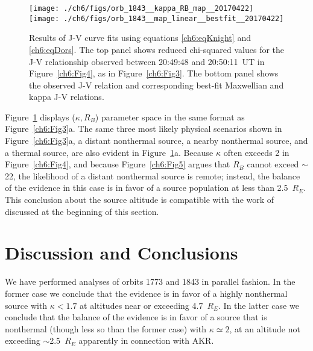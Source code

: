 
  \begin{figure}
    \centering
    \noindent\texttt{[image: ./ch6/figs/orb\_1843\_\_kappa\_RB\_map\_\_20170422]}
    \noindent\texttt{[image: ./ch6/figs/orb\_1843\_\_map\_linear\_\_bestfit\_\_20170422]}
    \caption[Orbit 1843: Reduced chi-squared values for observed J-V curves and
    corresponding best-fit J-V curves.]{Results of J-V curve fits using
      equations \ref{ch6:eqKnight} and \ref{ch6:eqDors}. The top panel shows
      reduced chi-squared values for the J-V relationship observed between
      20:49:48 and 20:50:11~UT in Figure~\ref{ch6:Fig4}, as in
      Figure~\ref{ch6:Fig3}. The bottom panel shows the observed J-V relation
      and corresponding best-fit Maxwellian and kappa J-V relations.}
    \label{ch6:Fig6}
  \end{figure}

  Figure~\ref{ch6:Fig6} displays ($\kappa, R_B$) parameter space in the same
  format as Figure~\ref{ch6:Fig3}a. The same three most likely physical
  scenarios shown in Figure~\ref{ch6:Fig3}a, a distant nonthermal source, a
  nearby nonthermal source, and a thermal source, are also evident in
  Figure~\ref{ch6:Fig6}a. Because $\kappa$ often exceeds 2 in
  Figure~\ref{ch6:Fig4}, and because Figure~\ref{ch6:Fig5} argues that $R_B$
  cannot exceed $\sim$22, the likelihood of a distant nonthermal source is
  remote; instead, the balance of the evidence in this case is in favor of a
  source population at less than 2.5~$R_E$. This conclusion about the source
  altitude is compatible with the work of \citet{Ergun1998} discussed at the
  beginning of this section.
  
  \section{Discussion and Conclusions}

  We have performed analyses of orbits 1773 and 1843 in parallel fashion. In the
  former case we conclude that the evidence is in favor of a highly nonthermal
  source with $\kappa < 1.7$ at altitudes near or exceeding 4.7~$R_E$. In the
  latter case we conclude that the balance of the evidence is in favor of a
  source that is nonthermal (though less so than the former case) with $\kappa
  \simeq 2$, at an altitude not exceeding $\sim$2.5~$R_E$ apparently in
  connection with AKR.

